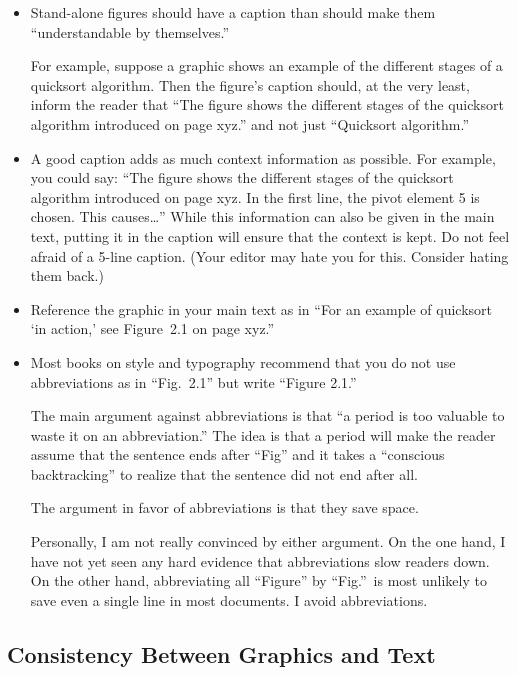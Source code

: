\eohs

\begin{itemize}
\item
  Stand-alone figures should have a caption than should make them
  ``understandable by themselves.''

  For example, suppose a graphic shows an example of the different
  stages of a quicksort algorithm. Then the figure's caption should,
  at the very least, inform the reader that ``The figure shows the
  different stages of the quicksort algorithm introduced on page
  xyz.'' and not just ``Quicksort algorithm.''
\item
  A good caption adds as much context information as possible. For
  example, you could say: ``The figure shows the different stages of
  the quicksort algorithm introduced on page xyz. In the first line,
  the pivot element 5 is chosen. This causes\dots'' While this
  information can also be given in the main text, putting it in the
  caption will ensure that the context is kept. Do not feel afraid of
  a 5-line caption. (Your editor may hate you for this. Consider
  hating them back.)
\item
  Reference the graphic in your main text as in ``For an example of
  quicksort `in action,' see Figure~2.1 on page xyz.''
\item
  Most books on style and typography recommend that you do not use
  abbreviations as in ``Fig.~2.1'' but write ``Figure 2.1.''

  The main argument against abbreviations is that ``a period is too
  valuable to waste it on an abbreviation.'' The idea is that a period
  will make the reader assume that the sentence ends after ``Fig'' and
  it takes a ``conscious backtracking'' to realize that the sentence
  did not end after all.

  The argument in favor of abbreviations is that they save space.

  Personally, I am not really convinced by either argument. On the one
  hand, I have not yet seen any hard evidence that abbreviations slow
  readers down. On the other hand,  abbreviating all ``Figure'' by
  ``Fig.''\ is most unlikely to save even a single line in  most
  documents. I avoid abbreviations.
\end{itemize}



\subsection{Consistency Between Graphics and Text}

